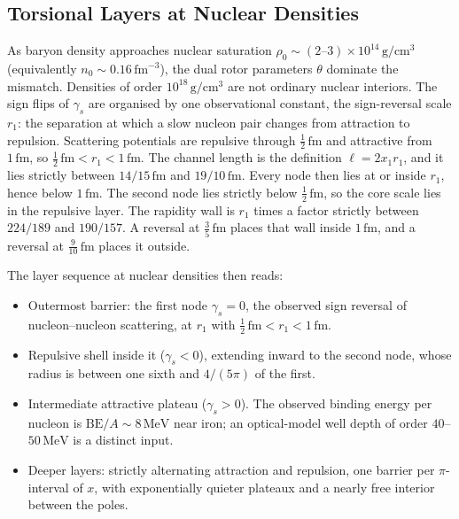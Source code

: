 \documentclass[a4paper]{article}
\begin{document}
\subsection{Torsional Layers at Nuclear Densities}

As baryon density approaches nuclear saturation
\(\rho_0\sim (2\text{--}3)\times 10^{14}\,\mathrm{g/cm^3}\)
(equivalently \(n_0\sim 0.16\,\mathrm{fm}^{-3}\)),
the dual rotor parameters \(\theta\) dominate the mismatch. Densities of order \(10^{18}\,\mathrm{g/cm^3}\) are not ordinary nuclear interiors. The sign flips of \(\gamma_s\) are organised by one observational constant, the sign-reversal scale \(r_1\): the separation at which a slow nucleon pair changes from attraction to repulsion. Scattering potentials are repulsive through \(\tfrac12\,\mathrm{fm}\) and attractive from \(1\,\mathrm{fm}\), so \(\tfrac12\,\mathrm{fm}<r_1<1\,\mathrm{fm}\). The channel length is the definition \(\ell=2x_1 r_1\), and it lies strictly between \(14/15\,\mathrm{fm}\) and \(19/10\,\mathrm{fm}\). Every node then lies at or inside \(r_1\), hence below \(1\,\mathrm{fm}\). The second node lies strictly below \(\tfrac12\,\mathrm{fm}\), so the core scale lies in the repulsive layer. The rapidity wall is \(r_1\) times a factor strictly between \(224/189\) and \(190/157\). A reversal at \(\tfrac35\,\mathrm{fm}\) places that wall inside \(1\,\mathrm{fm}\), and a reversal at \(\tfrac9{10}\,\mathrm{fm}\) places it outside.

The layer sequence at nuclear densities then reads:

\begin{itemize}
\item Outermost barrier: the first node \(\gamma_s=0\), the observed sign reversal of nucleon--nucleon scattering, at \(r_1\) with \(\tfrac12\,\mathrm{fm}<r_1<1\,\mathrm{fm}\).
\item Repulsive shell inside it (\(\gamma_s<0\)), extending inward to the second node, whose radius is between one sixth and \(4/(5\pi)\) of the first.
\item Intermediate attractive plateau (\(\gamma_s>0\)). The observed binding energy per nucleon is \(\mathrm{BE}/A\sim 8\,\mathrm{MeV}\) near iron; an optical-model well depth of order \(40\)--\(50\,\mathrm{MeV}\) is a distinct input.
\item Deeper layers: strictly alternating attraction and repulsion, one barrier per \(\pi\)-interval of \(x\), with exponentially quieter plateaux and a nearly free interior between the poles.
\end{itemize}
\end{document}
